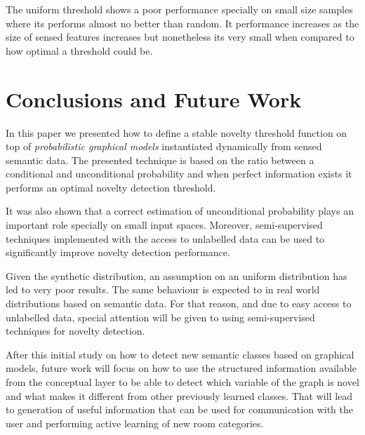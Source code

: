\documentclass[runningheads,a4paper]{llncs}
\begin{document}
The uniform threshold shows a poor performance specially on small size samples
where its performs almost no better than random.
It performance increases as the size of sensed features increases but nonetheless
its very small when compared to how optimal a threshold could be.


\section{Conclusions and Future Work}
\label{sec:conclusion}
In this paper we presented how to define a stable novelty threshold function on
top of \emph{probabilistic graphical models} instantiated dynamically from sensed
semantic data.
The presented technique is based on the ratio between a conditional and
unconditional probability and when perfect information exists it performs an optimal
novelty detection threshold.

It was also shown that a correct estimation of unconditional probability plays an
important role specially on small input spaces. Moreover, semi-supervised techniques
implemented with the access to unlabelled data can be used to significantly improve
novelty detection performance.

Given the synthetic distribution, an assumption on an uniform
distribution has led to very poor results. The same behaviour is expected to
in real world distributions based on semantic data. For that reason,
and due to easy access to unlabelled data, special attention will be given to using
semi-supervised techniques for novelty detection.

After this initial study on how to detect new semantic classes based on
graphical models, future work will focus on how to use the structured
information available from the conceptual layer to be able to detect which variable
of the graph is novel and what makes it different from other previously learned
classes. That will lead to generation of useful information that can be used for
communication with the user and performing active learning of new room categories.




\end{document}
